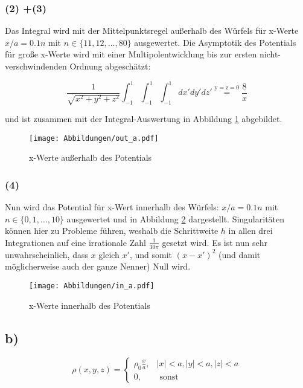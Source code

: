 \subsubsection*{(2) +(3)}
Das Integral wird mit der Mittelpunktsregel außerhalb des Würfels für x-Werte
$x / a=0.1 n$ mit $n \in\{11,12, \ldots, 80\}$ ausgewertet. Die Asymptotik des
Potentials für große x-Werte wird mit einer Multipolentwicklung bis zur ersten
nicht-verschwindenden Ordnung abgeschätzt:

\begin{equation*}
  \frac{1}{\sqrt{x^2+y^2+z^2}} \int_{-1}^1 \int_{-1}^1 \int_{-1}^1 dx'dy'dz'
  \overset{\mathrm{y=z=0}}{=} \frac{8}{x}
\end{equation*}

und ist zusammen mit der Integral-Auswertung in Abbildung \ref{fig:2a.2} abgebildet.

\begin{figure}[H]
    \centering
    \texttt{[image: Abbildungen/out\_a.pdf]}
    \caption{x-Werte außerhalb des Potentials}
    \label{fig:2a.2}
\end{figure}

\subsubsection*{(4)}
Nun wird das Potential für x-Wert innerhalb des Würfels:
$x / a=0.1 n$ mit $n \in\{0,1, \ldots, 10\}$ ausgewertet und in Abbildung \ref{fig:2a.4}
dargestellt. Singularitäten können hier zu Probleme führen, weshalb die Schrittweite $h$
in allen drei Integrationen auf eine irrationale Zahl $\frac{1}{30\pi}$ gesetzt wird.
Es ist nun sehr unwahrscheinlich, dass $x$ gleich $x'$, und somit $(x-x')^2$
(und damit möglicherweise auch der ganze Nenner) Null wird.

\begin{figure}[H]
    \centering
    \texttt{[image: Abbildungen/in\_a.pdf]}
    \caption{x-Werte innerhalb des Potentials}
    \label{fig:2a.4}
\end{figure}

\subsection*{b)}

\begin{equation}\rho(x, y, z)=\left\{\begin{array}{ll}
\rho_{0} \frac{x}{a}, & |x|<a,|y|<a,|z|<a \\
0, & \text { sonst }
\end{array}\right.\end{equation}

